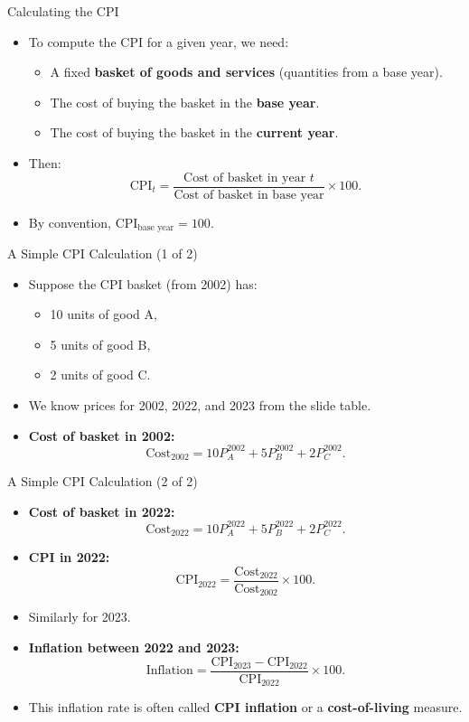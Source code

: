 \documentclass[aspectratio=169]{beamer}
\begin{document}
\begin{frame}{Calculating the CPI}
\transfade
\begin{itemize}
  \item To compute the CPI for a given year, we need:
  \begin{itemize}
    \item A fixed \textbf{basket of goods and services} (quantities from a base year).
    \item The cost of buying the basket in the \textbf{base year}.
    \item The cost of buying the basket in the \textbf{current year}.
  \end{itemize}
  \item Then:
  \[
    \text{CPI}_t = 
    \frac{\text{Cost of basket in year } t}{\text{Cost of basket in base year}} \times 100.
  \]
  \item By convention, \(\text{CPI}_{\text{base year}} = 100\).
\end{itemize}
\end{frame}

\begin{frame}{A Simple CPI Calculation (1 of 2)}
\transfade
\begin{itemize}
  \item Suppose the CPI basket (from 2002) has:
  \begin{itemize}
    \item 10 units of good A,
    \item 5 units of good B,
    \item 2 units of good C.
  \end{itemize}
  \item We know prices for 2002, 2022, and 2023 from the slide table.
  \item \textbf{Cost of basket in 2002:}
  \[
    \text{Cost}_{2002} = 
    10 P_A^{2002} + 5 P_B^{2002} + 2 P_C^{2002}.
  \]
\end{itemize}
\end{frame}

\begin{frame}{A Simple CPI Calculation (2 of 2)}
\transfade
\begin{itemize}
  \item \textbf{Cost of basket in 2022:}
  \[
    \text{Cost}_{2022} = 
    10 P_A^{2022} + 5 P_B^{2022} + 2 P_C^{2022}.
  \]
  \item \textbf{CPI in 2022:}
  \[
    \text{CPI}_{2022} = 
    \frac{\text{Cost}_{2022}}{\text{Cost}_{2002}} \times 100.
  \]
  \item Similarly for 2023.
  \item \textbf{Inflation between 2022 and 2023:}
  \[
    \text{Inflation} = 
    \frac{\text{CPI}_{2023} - \text{CPI}_{2022}}{\text{CPI}_{2022}} \times 100.
  \]
  \item This inflation rate is often called \textbf{CPI inflation} or a \textbf{cost-of-living} measure.
\end{itemize}
\end{frame}
\end{document}
